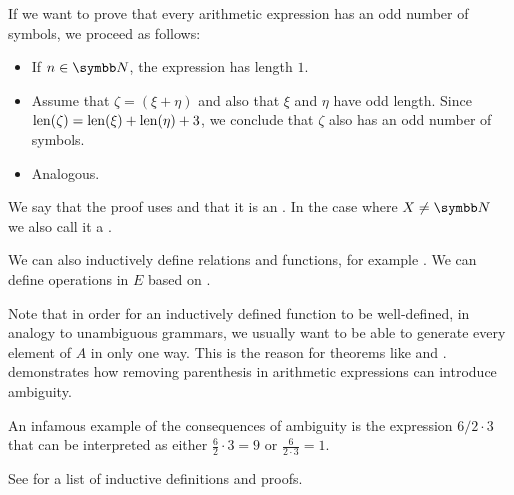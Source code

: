 \begin{remark}
  If we want to prove that every arithmetic expression has an odd number of symbols, we proceed as follows:
  \begin{itemize}
    \item If \( n \in \BN \), the expression has length \( 1 \).
    \item Assume that \( \zeta = (\xi + \eta) \) and also that \( \xi \) and \( \eta \) have odd length. Since \( \operatorname{len}(\zeta) = \operatorname{len}(\xi) + \operatorname{len}(\eta) + 3 \), we conclude that \( \zeta \) also has an odd number of symbols.
    \item Analogous.
  \end{itemize}

  We say that the proof uses  and that it is an . In the case where \( X \neq \BN \) we also call it a .

  We can also inductively define relations and functions, for example . We can define operations in \( E \) based on .

  Note that in order for an inductively defined function to be well-defined, in analogy to unambiguous grammars, we usually want to be able to generate every element of \( A \) in only one way. This is the reason for theorems like  and .  demonstrates how removing parenthesis in arithmetic expressions can introduce ambiguity.

  An infamous example of the consequences of ambiguity is the expression \( 6 / 2 \cdot 3 \) that can be interpreted as either \( \tfrac 6 2 \cdot 3 = 9 \) or \( \tfrac 6 {2 \cdot 3} = 1 \).

  See  for a list of inductive definitions and proofs.
\end{remark}
